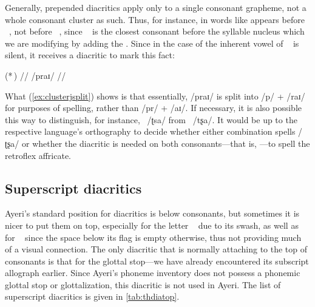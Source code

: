 Generally, prepended diacritics apply only to a single consonant grapheme, not
a whole consonant cluster as such. Thus, for instance, in words like 
  appears before ~, not before
~, since ~ is the closest consonant before the
syllable nucleus which we are modifying by adding the . Since in the
case of  the inherent vowel of ~ is silent, it
receives a diacritic  to mark this fact:

\ex[lingstyle=thex]\label{ex:clusterjsplit}
\begingl
\gla {} \quad (*\,) //
\glb /praɪ/ //
\endgl
\xe

What (\ref{ex:clusterjsplit}) shows is that essentially, /praɪ/ is split into
/p/ + /raɪ/ for purposes of spelling, rather than /pr/ + /aɪ/. If necessary, it
is also possible this way to distinguish, for instance, ~/ʈsa/ from
~/tʂa/. It would be up to the respective language's orthography to
decide whether either combination spells /ʈʂa/ or whether the 
diacritic is needed on both con\-so\-nants---that is, ---to spell the
retroflex affricate.

\subsection{Superscript diacritics}

Ayeri's standard position for diacritics is below consonants, but sometimes it
is nicer to put them on top, especially for the letter ~ due to
its swash, as well as for ~ since the space below its flag is
empty otherwise, thus not providing much of a visual connection. The only
diacritic that is normally attaching to the top of consonants is that for the
glottal stop---we have already encountered its subscript allograph earlier.
Since Ayeri's phoneme inventory does not possess a phonemic glottal stop or
glottalization, this diacritic is not used in Ayeri. The list of superscript
diacritics is given in \autoref{tab:thdiatop}.

